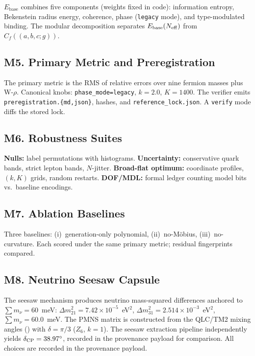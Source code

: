 \documentclass[11pt]{article}
\theoremstyle{remark}
\newcommand{\Cf}{C_{\!f}}
\newcommand{\triple}{(a,b,c;g)}
\begin{document}
$E_{\mathrm{base}}$ combines five components (weights fixed in code): information entropy, Bekenstein radius energy, coherence, phase (\texttt{legacy} mode), and type-modulated binding.
The modular decomposition separates $E_{\mathrm{base}}(N_{\rm eff})$ from $\Cf(\triple)$.

\subsection*{M5. Primary Metric and Preregistration}

The primary metric is the RMS of relative errors over nine fermion masses plus W-$\rho$.
Canonical knobs: \texttt{phase\_mode=legacy}, $k = 2.0$, $K = 1400$.
The verifier emits \texttt{preregistration.\{md,json\}}, hashes, and \texttt{reference\_lock.json}.
A \texttt{verify} mode diffs the stored lock.

\subsection*{M6. Robustness Suites}

\textbf{Nulls:} label permutations with histograms.
\textbf{Uncertainty:} conservative quark bands, strict lepton bands, $N$-jitter.
\textbf{Broad-flat optimum:} coordinate profiles, $(k,K)$ grids, random restarts.
\textbf{DOF/MDL:} formal ledger counting model bits vs.\ baseline encodings.

\subsection*{M7. Ablation Baselines}

Three baselines: (i)~generation-only polynomial, (ii)~no-M\"obius, (iii)~no-curvature.
Each scored under the same primary metric; residual fingerprints compared.

\subsection*{M8. Neutrino Seesaw Capsule}

The seesaw mechanism produces neutrino mass-squared differences anchored to $\sum m_\nu = 60$~meV:
$\Delta m_{21}^2 = 7.42 \times 10^{-5}$~eV$^2$,
$\Delta m_{31}^2 = 2.514 \times 10^{-3}$~eV$^2$,
$\sum m_\nu = 60.0$~meV.
The PMNS matrix is constructed from the QLC/TM2 mixing angles () with $\delta = \pi/3$ ($Z_6$, $k{=}1$).
The seesaw extraction pipeline independently yields $\delta_{\rm CP} = 38.97^\circ$, recorded in the provenance payload for comparison.
All choices are recorded in the provenance payload.
\end{document}
